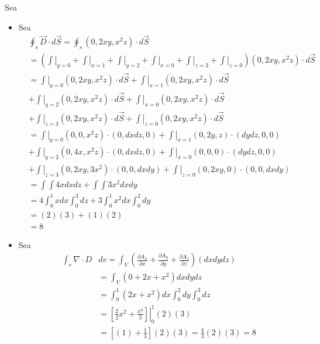 \begin{problema}
\begin{figure}[H]
\begin{tikzpicture}[x=0.75pt,y=0.75pt,yscale=-1,xscale=1]
\end{tikzpicture}
\end{figure}
\begin{sol}
    Sea 
    \begin{itemize}
        \item Sea
        \begin{align*} & \oint_s \vec{D} \cdot d \vec{S}=\oint_s\left(0,2 x y, x^2 z\right) \cdot d \vec{S} \\ 
            &= \left(\left.\int\right|_{y=0}+\left.\int\right|_{x=1}+\left.\int\right|_{y=2}+\left.\int\right|_{x=0}+\left.\int\right|_{z=3}+\left.\int\right|_{z=0}\right) \left(0,2 x y, x^2 z\right) \cdot d \vec{S}\\
             &= \left.\int\right|_{y=0}\left(0,2 x y, x^2 z\right) \cdot d \vec{S}+\left.\int\right|_{x=1}\left(0,2 x y, x^2 z\right) \cdot d \vec{S}\\&+\left.\int\right|_{y=2}\left(0,2 x y, x^2 z\right) \cdot d \vec{S}+\left.\int\right|_{x=0}\left(0,2 x y, x^2 z\right) \cdot d \vec{S}\\
             &+\left.\int\right|_{z=3}\left(0,2 x y, x^2 z\right) \cdot d \vec{S}+\left.\int\right|_{z=0}\left(0,2 x y, x^2 z\right) \cdot d \vec{S}\\
             &= \left.\int\right|_{y=0}\left(0,0, x^2 z\right) \cdot (0, d x d z,0)+\left.\int\right|_{x=1}\left(0,2y, z\right) \cdot (d y d z, 0, 0)\\&+\left.\int\right|_{y=2}\left(0,4 x, x^2 z\right) \cdot (0, d x d z, 0)+\left.\int\right|_{x=0}\left(0,0, 0\right) \cdot (d y d z, 0, 0)\\
             &+\left.\int\right|_{z=3}\left(0,2 x y, 3x^2 \right) \cdot(0,0, d x d y)+\left.\int\right|_{z=0}\left(0,2 x y, 0\right) \cdot (0, 0, d x d y)\\
             &= \int \int 4xdxdz + \int\int 3x^2 dxdy\\
             &= 4\int_0^1 xdx\int_0^3 dz+3\int_0^1 x^2 dx\int_0^2 dy\\
             &= (2)(3)+(1)(2)\\
             &=8
        \end{align*}
        \item Sea 
        \begin{align*}\int_v \nabla \cdot D & d v=\int_V\left(\frac{\partial A_x}{\partial x}+\frac{\partial A_y}{\partial y}+\frac{\partial A_z}{\partial z}\right)(d x d y d z) \\ & =\int_V\left(0+2 x+x^2\right) d x d y d z \\ & =\int_0^1\left(2 x+x^2\right) d x \int_0^2 d y \int_0^3 d z \\ & =\left.\left[\frac{2}{2} x^2+\frac{x^3}{3}\right]\right|_0 ^1(2)(3) \\ & =\left[(1)+\frac{1}{3}\right](2)(3)=\frac{4}{3}(2)(3)=8\end{align*}
    \end{itemize}
\end{sol}
\end{problema}
%
%

